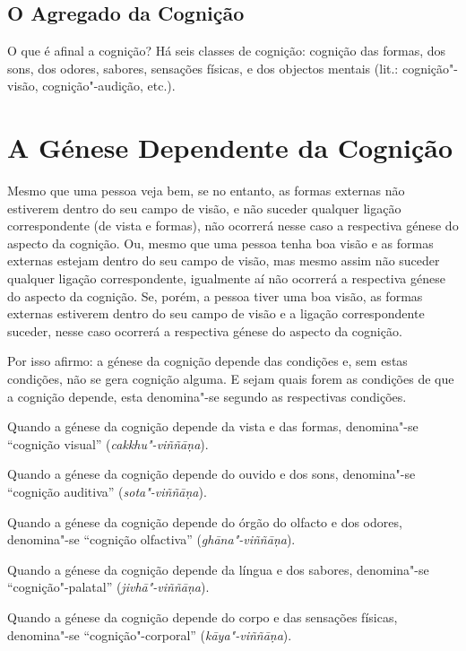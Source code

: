 \subsection{O Agregado da Cognição}


O que é afinal a cognição? Há seis classes de cognição: cognição das formas, dos
sons, dos odores, sabores, sensações físicas, e dos objectos mentais (lit.:
cognição"-visão, cognição"-audição, etc.).


\section{A Génese Dependente da Cognição}

Mesmo que uma pessoa veja bem, se no entanto, as formas externas não estiverem
dentro do seu campo de visão, e não suceder qualquer ligação correspondente (de
vista e formas), não ocorrerá nesse caso a respectiva génese do aspecto da
cognição. Ou, mesmo que uma pessoa tenha boa visão e as formas externas estejam
dentro do seu campo de visão, mas mesmo assim não suceder qualquer ligação
correspondente, igualmente aí não ocorrerá a respectiva génese do aspecto da
cognição. Se, porém, a pessoa tiver uma boa visão, as formas externas estiverem
dentro do seu campo de visão e a ligação correspondente suceder, nesse caso
ocorrerá a respectiva génese do aspecto da cognição.


Por isso afirmo: a génese da cognição depende das condições e, sem estas
condições, não se gera cognição alguma. E sejam quais forem as condições de que
a cognição depende, esta denomina"-se segundo as respectivas condições.

Quando a génese da cognição depende da vista e das formas, denomina"-se
“cognição visual” (\emph{cakkhu"-viññāṇa}).

Quando a génese da cognição depende do ouvido e dos sons, denomina"-se “cognição
auditiva” (\emph{sota"-viññāṇa}).

Quando a génese da cognição depende do órgão do olfacto e dos odores,
denomina"-se “cognição olfactiva” (\emph{ghāna"-viññāṇa}).

Quando a génese da cognição depende da língua e dos sabores, denomina"-se
“cognição"-palatal” (\emph{jivhā"-viññāṇa}).

Quando a génese da cognição depende do corpo e das sensações físicas,
denomina"-se “cognição"-corporal” (\emph{kāya"-viññāṇa}).

